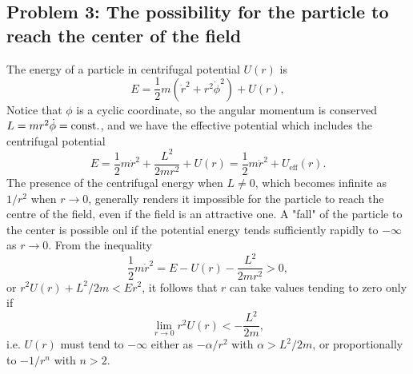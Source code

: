 \documentclass[10pt]{article}
\begin{document}
\subsection{Problem 3: The possibility for the particle to reach the center of the field}
The energy of a particle in centrifugal potential $U(r)$ is 
\begin{equation}
	E = \frac{1}{2} m (\dot{r}^2 + r^2 \dot{\phi}^2) + U(r),
\end{equation}
Notice that $\phi$ is a cyclic coordinate, so the angular momentum is conserved $L = m r^2 \dot{\phi} = {\mathrm{const.}}$, and we have the effective potential which includes the centrifugal potential 
\begin{equation}
	E = \frac{1}{2} m \dot{r}^2 + \frac{L^2}{2m r^2} + U(r) =  \frac{1}{2} m \dot{r}^2 + U_{\text{eff}}(r).
\end{equation}
The presence of the centrifugal energy when $L \neq 0$, which becomes infinite as $1 / r^2$ when $r \to 0$, generally renders it impossible for the particle to reach the centre of the field, even if the field is an attractive one. A "fall" of the particle to the center is possible onl if the potential energy tends sufficiently rapidly to $-\infty$ as $r \to 0$. From the inequality 
\begin{equation}
	\frac{1}{2} m \dot{r}^2 = E - U(r) - \frac{L^2}{2 m r^2}>0,  
\end{equation}
or $r^2 U(r) + L^2 / 2m < E r^2$, it follows that $r$ can take values tending to zero only if 
\begin{equation}
	\lim_{r \to 0} r^2 U(r) < - \frac{L^2}{2m},
\end{equation}
i.e. $U(r)$ must tend to $-\infty$ either as $-\alpha / r^2$ with $\alpha>  L^2 / 2m$, or proportionally to $- 1/r^n$ with $n> 2 $.
\end{document}
